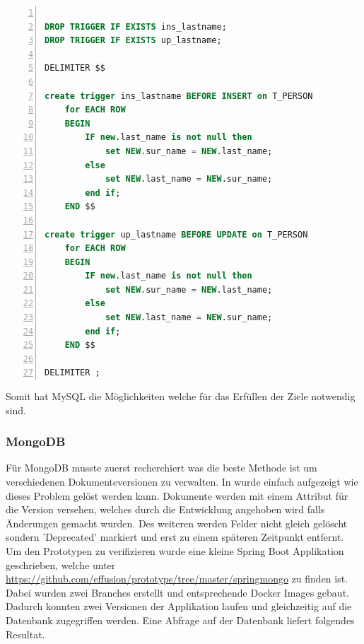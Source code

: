 \begin{lstlisting}[language=SQL, showspaces=false, basicstyle=\ttfamily, numbers=left, numberstyle=\tiny, commentstyle=\color{gray}]

DROP TRIGGER IF EXISTS ins_lastname;
DROP TRIGGER IF EXISTS up_lastname;

DELIMITER $$

create trigger ins_lastname BEFORE INSERT on T_PERSON
	for EACH ROW
	BEGIN
		IF new.last_name is not null then
			set NEW.sur_name = NEW.last_name;
		else
			set NEW.last_name = NEW.sur_name;
		end if;
	END $$

create trigger up_lastname BEFORE UPDATE on T_PERSON
	for EACH ROW
	BEGIN
		IF new.last_name is not null then
			set NEW.sur_name = NEW.last_name;
		else
			set NEW.last_name = NEW.sur_name;
		end if;
	END $$

DELIMITER ;

\end{lstlisting}
Somit hat MySQL die Möglichkeiten welche für das Erfüllen der Ziele notwendig sind.
\newpage
\subsubsection{MongoDB}

Für MongoDB musste zuerst recherchiert was die beste Methode ist um verschiedenen Dokumenteversionen zu verwalten. In \cite{mongoschema} wurde einfach aufgezeigt wie dieses Problem gelöst werden kann. Dokumente werden mit einem Attribut für die Version versehen, welches durch die Entwicklung angehoben wird falls Änderungen gemacht wurden. Des weiteren werden Felder nicht gleich gelöscht sondern 'Deprecated' markiert und erst zu einem späteren Zeitpunkt entfernt. Um den Prototypen zu verifizieren wurde eine kleine Spring Boot Applikation geschrieben, welche unter \url{https://github.com/effusion/prototyps/tree/master/springmongo} zu finden ist. Dabei wurden zwei Branches erstellt und entsprechende Docker Images gebaut. Dadurch konnten zwei Versionen der Applikation laufen und gleichzeitig auf die Datenbank zugegriffen werden. 
Eine Abfrage auf der Datenbank liefert folgendes Resultat.


